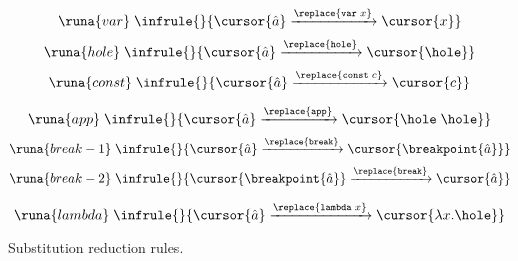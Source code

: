 \begin{table}[H]
    \centering
    \begin{adjmulticols}{3}{-56pt}{-1in}
    \begin{equation*}
        \runa{var}\; \infrule{}{\cursor{\hat{a}} \xrightarrow{\replace{\texttt{var}\; x}} \cursor{x}}         
    \end{equation*}\break
    \begin{equation*}
        \runa{hole}\; \infrule{}{\cursor{\hat{a}} \xrightarrow{\replace{\texttt{hole}}} \cursor{\hole}}  
    \end{equation*}\break
    \begin{equation*}
        \runa{const}\; \infrule{}{\cursor{\hat{a}} \xrightarrow{\replace{\texttt{const}\; c}} \cursor{c}}  
    \end{equation*}
    \vspace*{-0.6cm}
    \end{adjmulticols}
    \vspace*{-1.5cm}
    \begin{adjmulticols}{3}{-56pt}{-1in}
    \begin{equation*}
        \runa{app}\; \infrule{}{\cursor{\hat{a}} \xrightarrow{\replace{\texttt{app}}} \cursor{\hole\; \hole}}  
    \end{equation*}\break
    \begin{equation*}
          \runa{break-1}\; \infrule{}{\cursor{\hat{a}} \xrightarrow{\replace{\texttt{break}}} \cursor{\breakpoint{\hat{a}}}}
    \end{equation*}\break
    \begin{equation*}
          \runa{break-2}\; \infrule{}{\cursor{\breakpoint{\hat{a}}} \xrightarrow{\replace{\texttt{break}}} \cursor{\hat{a}}}
    \end{equation*}
    \end{adjmulticols}
    \vspace*{-1cm}
    \vspace*{-0.5cm}
    \begin{adjmulticols}{1}{62pt}{0.4in}
        \begin{equation*}
        \runa{lambda}\; \infrule{}{\cursor{\hat{a}} \xrightarrow{\replace{\texttt{lambda}\; x}} \cursor{\lambda x.\hole}}
      \end{equation*}
    \end{adjmulticols}
    \caption{Substitution reduction rules.}
    \label{tab:SUBsem}
\end{table}

